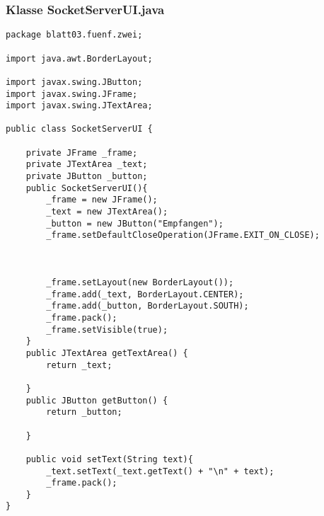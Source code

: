 \documentclass[twoside]{article}
\begin{document}
\subsubsection*{Klasse SocketServerUI.java}
\begin{lstlisting}
package blatt03.fuenf.zwei;

import java.awt.BorderLayout;

import javax.swing.JButton;
import javax.swing.JFrame;
import javax.swing.JTextArea;

public class SocketServerUI {

	private JFrame _frame;
	private JTextArea _text;
	private JButton _button;
	public SocketServerUI(){
		_frame = new JFrame();
		_text = new JTextArea();
		_button = new JButton("Empfangen");
		_frame.setDefaultCloseOperation(JFrame.EXIT_ON_CLOSE);
		
		
		
		_frame.setLayout(new BorderLayout());
		_frame.add(_text, BorderLayout.CENTER);
		_frame.add(_button, BorderLayout.SOUTH);
		_frame.pack();
		_frame.setVisible(true);
	}
	public JTextArea getTextArea() {
		return _text;
		
	}
	public JButton getButton() {
		return _button;
		
	}
	
	public void setText(String text){
		_text.setText(_text.getText() + "\n" + text);
		_frame.pack();
	}
}
\end{lstlisting}
\end{document}
